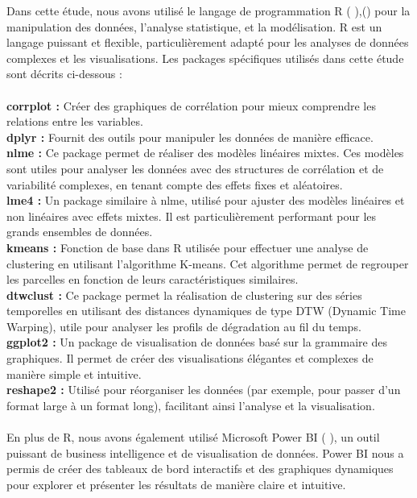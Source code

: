 \documentclass{report}
\begin{document}
 Dans cette étude, nous avons utilisé le langage de programmation R ( \cite{documentR} ),(\cite{millot2018comprendre}) pour la manipulation des données, l'analyse statistique, et la modélisation. R est un langage puissant et flexible, particulièrement adapté pour les analyses de données complexes et les visualisations. Les packages spécifiques utilisés dans cette étude sont décrits ci-dessous :\\\\
\large\textbf{corrplot :} Créer des graphiques de corrélation pour mieux comprendre les relations entre les variables.\\
\large\textbf{dplyr :} Fournit des outils pour manipuler les données de manière efficace.\\
\large\textbf{nlme :} Ce package permet de réaliser des modèles linéaires mixtes. Ces modèles sont utiles pour analyser les données avec des structures de corrélation et de variabilité complexes, en tenant compte des effets fixes et aléatoires.\\
\large\textbf{lme4 :} Un package similaire à nlme, utilisé pour ajuster des modèles linéaires et non linéaires avec effets mixtes. Il est particulièrement performant pour les grands ensembles de données.\\
\large\textbf{kmeans :} Fonction de base dans R utilisée pour effectuer une analyse de clustering en utilisant l'algorithme K-means. Cet algorithme permet de regrouper les parcelles en fonction de leurs caractéristiques similaires.\\
\large\textbf{dtwclust :} Ce package permet la réalisation de clustering sur des séries temporelles en utilisant des distances dynamiques de type DTW (Dynamic Time Warping), utile pour analyser les profils de dégradation au fil du temps.\\
\large\textbf{ggplot2 :} Un package de visualisation de données basé sur la grammaire des graphiques. Il permet de créer des visualisations élégantes et complexes de manière simple et intuitive.\\
\large\textbf{reshape2 :} Utilisé pour réorganiser les données (par exemple, pour passer d'un format large à un format long), facilitant ainsi l'analyse et la visualisation.
\\\\
En plus de R, nous avons également utilisé Microsoft Power BI ( \cite{power} ), un outil puissant de business intelligence et de visualisation de données. Power BI nous a permis de créer des tableaux de bord interactifs et des graphiques dynamiques pour explorer et présenter les résultats de manière claire et intuitive.
\\
\end{document}
